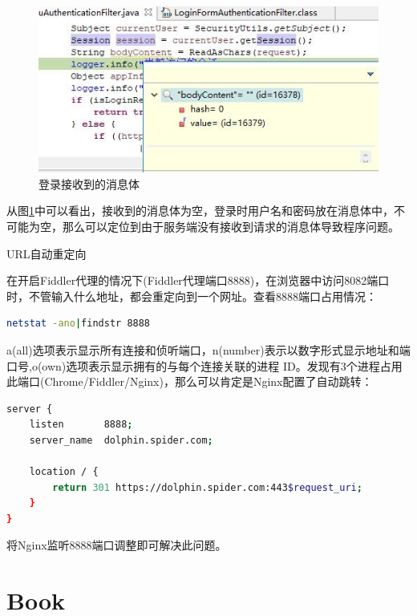 \documentclass[8pt]{book}
\makeatletter
\numberwithin{dummy}{section}
\theoremstyle{ocrenumbox}
\theoremstyle{blacknumex}
\theoremstyle{blacknumbox}
\theoremstyle{ocrenum}
\renewcommand{\subsection}{\@startsection {subsection}{2}{\z@}
	{-3ex \@plus -0.1ex \@minus -.4ex}
	{0.5ex \@plus.2ex }
	{\normalfont\sffamily\bfseries}}
\makeatother
\begin{document}
\begin{figure}[htbp]
	\centering
	\includegraphics[scale=0.8]{loginrecievebody.jpg}
	\caption{登录接收到的消息体}
	\label{fig:loginrecievebody}
\end{figure}

从图\ref{fig:loginrecievebody}中可以看出，接收到的消息体为空，登录时用户名和密码放在消息体中，不可能为空，那么可以定位到由于服务端没有接收到请求的消息体导致程序问题。

\subsection{URL自动重定向}

在开启Fiddler代理的情况下(Fiddler代理端口8888)，在浏览器中访问8082端口时，不管输入什么地址，都会重定向到一个网址。查看8888端口占用情况：

\begin{lstlisting}[language=Bash]
netstat -ano|findstr 8888
\end{lstlisting}

a(all)选项表示显示所有连接和侦听端口，n(number)表示以数字形式显示地址和端口号,o(own)选项表示显示拥有的与每个连接关联的进程 ID。发现有3个进程占用此端口(Chrome/Fiddler/Nginx)，那么可以肯定是Nginx配置了自动跳转：

\begin{lstlisting}[language=Bash]
server {
    listen       8888;
    server_name  dolphin.spider.com;      

    location / {
        return 301 https://dolphin.spider.com:443$request_uri;
    }
}
\end{lstlisting}

将Nginx监听8888端口调整即可解决此问题。


\part{Book}
\end{document}
